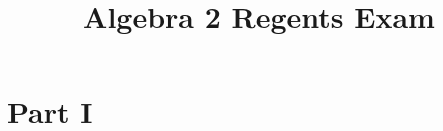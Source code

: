 \documentclass[12pt, twoside]{article}
\title{Algebra 2 Regents Exam}
\begin{document}
\maketitle

\section*{Part I}

\begin{enumerate}%



\end{enumerate}
\end{document}
